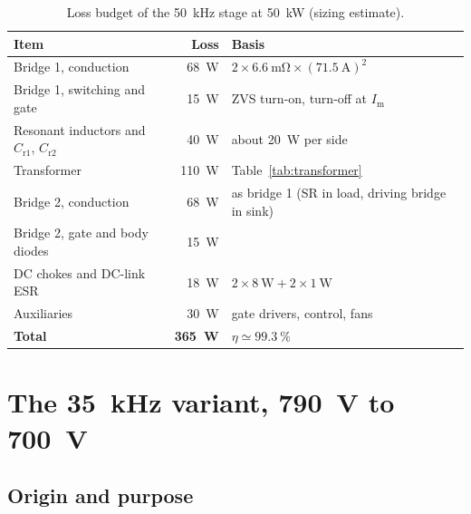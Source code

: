 \documentclass[12pt,a4paper]{scrartcl}
\newcommand{\ped}[1]{_{\mathrm{#1}}}
\begin{document}
\begin{onehalfspace}
\begin{table}[H]
	\centering
	\captionsetup{width=0.9\textwidth, font=small}
	\caption{Loss budget of the \SI{50}{\kilo\hertz} stage at \SI{50}{\kilo\watt} (sizing estimate).}
	\label{tab:losses}
	\begin{tabularx}{0.9\textwidth}{@{} l r X @{}}
		\toprule
		\textbf{Item} & \textbf{Loss} & \textbf{Basis} \\
		\midrule
		Bridge 1, conduction & \SI{68}{\watt} & $2 \times \SI{6.6}{\milli\ohm} \times (\SI{71.5}{\ampere})^2$ \\
		Bridge 1, switching and gate & \SI{15}{\watt} & ZVS turn-on, turn-off at $I\ped{m}$ \\
		Resonant inductors and $C\ped{r1}$, $C\ped{r2}$ & \SI{40}{\watt} & about \SI{20}{\watt} per side \\
		Transformer & \SI{110}{\watt} & Table~\ref{tab:transformer} \\
		Bridge 2, conduction & \SI{68}{\watt} & as bridge 1 (SR in load, driving bridge in sink) \\
		Bridge 2, gate and body diodes & \SI{15}{\watt} & \\
		DC chokes and DC-link ESR & \SI{18}{\watt} & $2 \times \SI{8}{\watt} + 2 \times \SI{1}{\watt}$ \\
		Auxiliaries & \SI{30}{\watt} & gate drivers, control, fans \\
		\midrule
		\textbf{Total} & \textbf{\SI{365}{\watt}} & $\eta \simeq \SI{99.3}{\percent}$ \\
		\bottomrule
	\end{tabularx}
\end{table}

\section{The \SI{35}{\kilo\hertz} variant, \SI{790}{\volt} to \SI{700}{\volt}}
\label{sec:variant}

\subsection{Origin and purpose}
\label{sec:variant_origin}


\end{onehalfspace}
\end{document}
